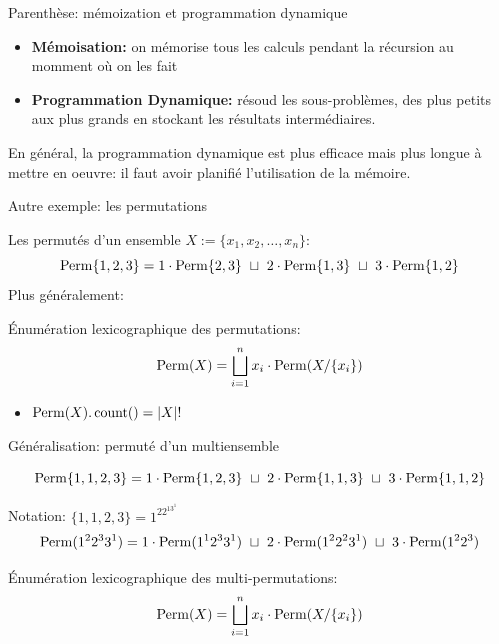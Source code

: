 \documentclass{beamer}
\begin{document}
\begin{frame}{Parenthèse: mémoization et programmation dynamique}

  \begin{NOTE}
    \begin{itemize}
    \item\textbf{Mémoisation:} on mémorise tous les calculs pendant la
      récursion au momment où on les fait \pause\bigskip

    \item\textbf{Programmation Dynamique:} résoud les sous-problèmes, des plus
      petits aux plus grands en stockant les résultats intermédiaires.
    \end{itemize}
  \end{NOTE}
  \pause\bigskip

  En général, la programmation dynamique est plus efficace mais plus longue à
  mettre en oeuvre: il faut avoir planifié l'utilisation de la mémoire.
\end{frame}

\begin{frame}{Autre exemple: les permutations}

  Les permutés d'un ensemble $X := \{x_1, x_2, \dots, x_n\}$:
  $$\Perm\{1,2,3\} = 
  1\cdot\Perm\{2,3\}\ \sqcup\ 
  2\cdot\Perm\{1,3\}\ \sqcup\ 
  3\cdot\Perm\{1,2\}
  $$
  Plus généralement:
  \begin{NOTE}
    Énumération lexicographique des permutations:
    $$
    \operatorname{Perm}(X) = \bigsqcup_{i=1}^{n} x_i\cdot\operatorname{Perm}(X/\{x_i\})
    $$
  \end{NOTE}
  \begin{itemize}
  \item $\operatorname{Perm}(X).\operatorname{count}() = |X|!$
  \end{itemize}
\end{frame}

\begin{frame}{Généralisation: permuté d'un multiensemble}

  $$\operatorname{Perm}\{1,1,2,3\} =
  1\cdot\operatorname{Perm}\{1,2,3\}\ \sqcup\
  2\cdot\operatorname{Perm}\{1,1,3\}\ \sqcup\
  3\cdot\operatorname{Perm}\{1,1,2\}
  $$
  \bigskip

  Notation: $\{1,1,2,3\} = 1^22^13^1$
  $$\operatorname{Perm}(1^22^33^1) =
  1\cdot\operatorname{Perm}(1^12^33^1)\ \sqcup\
  2\cdot\operatorname{Perm}(1^22^23^1)\ \sqcup\
  3\cdot\operatorname{Perm}(1^22^3)
  $$

  \begin{NOTE}
    Énumération lexicographique des multi-permutations:
    $$
    \operatorname{Perm}(X) = \bigsqcup_{i=1}^{n} x_i\cdot\operatorname{Perm}(X/\{x_i\})
    $$
  \end{NOTE}
\end{frame}
\end{document}
